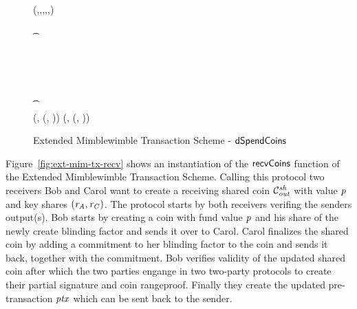 \begin{landscape}
\begin{figure}
{{        \varPreTx \opFunResult \\
        \procCreatePreTx{\varMsg}{\funArray{\varCoinInp}}{\funArray{\varCoinOutAlice}}{\funArray{\varProofAlice}}{\varSigContext}{\funArray{\funGen{\varNonceAlice}}}{\cnstEmptySet} \< \< \\
        \< \sendmessageright*{\varPreTx} \< \\
        \< \< (\varMsg,\varInputs,\varOutputs,\varProofs,\varSigContext,\varCommits) \opFunResult \varPreTx \\
        \< \< \pcif \procVerfProof{\varProofs[0]}{\varOutputs[0]}  \\
        \< \< \t \pcreturn \cnstFalsum \\
        \< \< \varSigContext \opFunResult \procSetupCtx{\varSigContext}{\funGen{\varSecKeyCarol}}{\funGen{\varNonceCarol}} \\
        \< \< \varPreTx \opFunResult \procCreatePreTx{\varMsg}{\varInputs}{\varOutputs \opConc \varCoinOutCarol}{\varProof \opConc \varProofCarol}{\varSigContext}{\varCommits \opConc \funGen{\varNonceCarol}}{\cnstEmptySet} \\
        \< \sendmessageleft*{\varPreTx} \< \\
        \pcif {}  \< \< \\
        \t \pcreturn \cnstFalsum \< \< \\
        \pcreturn (\varPreTx, (\varSecKeyAlice, \varNonceAlice)) \< \< \pcreturn (\varPreTx, (\varSecKeyCarol, \varNonceCarol)) \\
        }
        }
        \caption{Extended Mimblewimble Transaction Scheme - $\mathsf{dSpendCoins}$ \label{fig:ext-mim-tx-spend}}
    \end{figure}
\end{landscape}

Figure~\ref{fig:ext-mim-tx-recv} shows an instantiation of the $\mathsf{recvCoins}$ function of the Extended Mimblewimble Transaction Scheme. Calling this protocol two receivers Bob and Carol want to create a
receiving shared coin $\mathcal{C}_{\mathit{out}}^{\mathit{sh}}$ with value $\mathit{p}$ and key shares $(\mathit{r}_{\mathit{A}}, \mathit{r}_{\mathit{C}})$. The protocol starts by both receivers verifing the senders output(s). Bob starts by creating a coin with
fund value $\mathit{p}$ and his share of the newly create blinding factor and sends it over to Carol. Carol finalizes the shared coin by adding a commitment to her blinding factor to the coin and sends it back, together
with the commitment. Bob verifies validity of the updated shared coin after which the two parties engange in two two-party protocols to create their partial signature and coin rangeproof. Finally they create the updated
pre-transaction $\mathit{ptx}$ which can be sent back to the sender.

